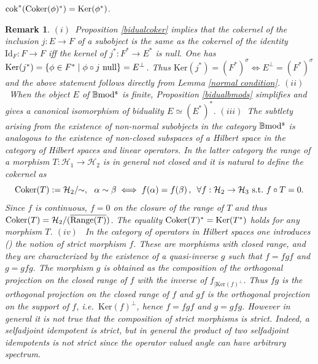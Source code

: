 \documentclass[12pt]{article}
\newtheorem{rem}[thm]{Remark}
\def\id{{\rm id}}
\def\Ker{{\rm Ker}}
\def\coker{{\rm Coker}}
\def\scoker{{\rm cok}}
\def\B{{\mathbb B}}
\def\cH{{\mathcal H}}
\def\qqq{\,,\,~\forall}
\newcommand{\ie}{{\it i.e.\/}\ }
\def\id{{\mbox{Id}}}
\def\ker{{\mbox{Ker}}}
\def\b2{{\rm \B mod^{\mathfrak s}}}
\begin{document}
  $\scoker^*(\coker(\phi)^*)= \ker(\phi^*)$.\endproof 
 \begin{rem}\label{normal closure rem}{\rm $(i)$~Proposition \ref{bidualcoker} implies that the cokernel of the inclusion $j:E\to F$ of a subobject is the same as the cokernel of the identity $\id_F:F\to F$ iff the kernel of $j^*:F^*\to E^*$ is null. One has $\ker(j^*)=\{\phi\in F^*\mid \phi\circ j \ {\rm null}\}=E^\perp$. Thus $\ker(j^*)=(F^*)^\sigma \iff E^\perp=(F^*)^\sigma$ and the above statement follows directly from Lemma \ref{normal condition}.\newline
 $(ii)$~When  the  object $E$ of $\b2$ is finite, Proposition 	\ref{bidualbmods} simplifies and gives a canonical isomorphism of biduality $E\simeq (E^*)^*$.\newline
 $(iii)$~The subtlety arising from the existence of non-normal subobjects in the category $\b2$ is  analogous to the existence of non-closed subspaces of a Hilbert space in the category of Hilbert spaces and  linear operators. In the latter category the range of a morphism $T:\cH_1\to \cH_2$ is in general not closed and it is natural to define the cokernel as
 $$
 \coker(T):=\cH_2/\!\!\sim,\  \  \alpha\sim \beta\iff f(\alpha)=f(\beta)\qqq f:\cH_2\to \cH_3~{\rm s.t.}~ f\circ T=0.
 $$
 Since $f$ is continuous, $f=0$ on the {\em closure} of the range of $T$ and thus  $\coker(T)=\cH_2/(\overline{{\rm Range}(T)})$. The equality $\coker(T)^*=\Ker(T^*)$ holds for any morphism $T$. 
 \newline
 $(iv)$~ In the category of operators in Hilbert spaces one introduces (\!\!\cite{bbk}) the notion of {\em strict morphism} $f$. These are morphisms with closed range, and they are characterized by the existence of a quasi-inverse $g$ such that 
  $f=fgf$ and $g=gfg$. The morphism $g$ is obtained as the composition of the orthogonal projection on the closed range of $f$ with the inverse of $f_{\vert \ker(f)^\perp}$. Thus $fg$ is the orthogonal projection on the closed range of $f$  and $gf$ is the  orthogonal projection on the support of $f$, \ie  $\ker(f)^\perp$, hence  $f=fgf$ and $g=gfg$. However in general it is not true that the composition of strict morphisms is strict.  Indeed, a selfadjoint idempotent is strict, but in general the product of two selfadjoint idempotents is not strict since the operator valued angle can have arbitrary spectrum.
 }\end{rem}
 
\end{document}
